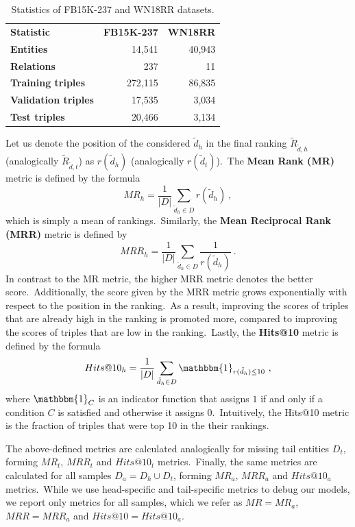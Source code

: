 \documentclass[longabstract, english, mgr]{iithesis}
\theoremstyle{default_theorem_style}\newtheorem{theorem}{Theorem}
\theoremstyle{default_theorem_style}\newtheorem{definition}{Definition}
\begin{document}
\begin{table}[!t]
\centering
\def\arraystretch{1.1}
\begin{tabular}{| l | r | r |}
 \hline
 \textbf{Statistic} & \textbf{FB15K-237} & \textbf{WN18RR} \\ [0.5ex]
 \Xhline{4\arrayrulewidth}
 \textbf{Entities} & 14,541 & 40,943 \\
 \hline
 \textbf{Relations} & 237 & 11 \\
 \hline
 \textbf{Training triples} & 272,115 & 86,835 \\
 \hline
 \textbf{Validation triples} & 17,535 & 3,034 \\
 \hline
 \textbf{Test triples} & 20,466 & 3,134 \\
 \hline
\end{tabular}
\caption{Statistics of FB15K-237 and WN18RR datasets.}
\label{tab:datasets}
\end{table}

\noindent Let us denote the position of the considered $\tilde{d}_h$ in the final ranking
$\tilde{R}_{\tilde{d}, h}$ (analogically $\tilde{R}_{\tilde{d}, t}$) as $r(\tilde{d}_h)$
(analogically $r(\tilde{d}_t)$).\ The \textbf{Mean Rank (MR)} metric is defined by the formula
$$
MR_h = \frac{1}{|D|} \sum_{\tilde{d}_h \in D} r(\tilde{d}_h)\ ,
$$
which is simply a mean of rankings.\ Similarly, the \textbf{Mean Reciprocal Rank (MRR)} metric is defined by
$$
MRR_h = \frac{1}{|D|} \sum_{\tilde{d}_h \in D} \frac{1}{r(\tilde{d}_h)}\ .
$$
In contrast to the MR metric, the higher MRR metric denotes the better score.\ Additionally, the score given by the
MRR metric grows exponentially with respect to the position in the ranking.\ As a result, improving the scores of
triples that are already high in the ranking is promoted more, compared to improving the scores of triples that are
low in the ranking.\ Lastly, the \textbf{Hits@10} metric is defined by the formula
$$
Hits@10_h = \frac{1}{|D|} \sum_{\tilde{d}_h \in D} \mathbbm{1}_{r(\tilde{d}_h) \leq 10}\ ,
$$
where $\mathbbm{1}_C$ is an indicator function that assigns $1$ if and only if a condition $C$ is satisfied and
otherwise it assigns $0$.\ Intuitively, the Hits@10 metric is the fraction of triples that were top 10 in the their
rankings.\newline

\noindent The above-defined metrics are calculated analogically for missing tail entities $D_t$, forming $MR_t$, $MRR_t$
and $Hits@10_t$ metrics.\ Finally, the same metrics are calculated for all samples $D_a = D_h \cup D_t$, forming $MR_a$,
$MRR_a$ and $Hits@10_a$ metrics.\ While we use head-specific and tail-specific metrics to debug our models, we report
only metrics for all samples, which we refer as $MR = MR_a$, $MRR = MRR_a$ and $Hits@10 = Hits@10_a$.\newline
\end{document}
